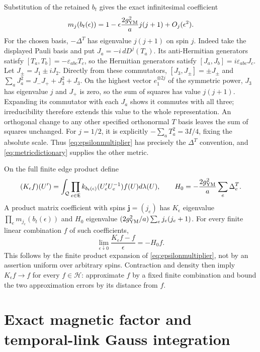 \documentclass[11pt]{article}
\begin{document}
Substitution of the retained $b_t$ gives the exact infinitesimal
coefficient
\begin{equation}\label{eq:epsilonmultiplier}
 m_j(b_t(\epsilon))
 =1-\epsilon\frac{2g_{\rm YM}^2}{a}j(j+1)+O_j(\epsilon^2).
\end{equation}
For the chosen basis, $-\Delta^T$ has eigenvalue $j(j+1)$ on spin $j$.
Indeed take the displayed Pauli basis and put $J_a=-i\,dD^j(T_a)$.
Its anti-Hermitian generators satisfy $[T_a,T_b]=-\varepsilon_{abc}T_c$,
so the Hermitian generators satisfy $[J_a,J_b]=i\varepsilon_{abc}J_c$.
Let $J_\pm=J_1\pm iJ_2$. Directly from these commutators,
$[J_3,J_\pm]=\pm J_\pm$ and
$\sum_aJ_a^2=J_-J_++J_3^2+J_3$. On the highest vector
$e_1^{\otimes 2j}$ of the symmetric power, $J_3$ has eigenvalue $j$
and $J_+$ is zero, so the sum of squares has value $j(j+1)$.
Expanding its commutator with each $J_a$ shows it commutes with all
three; irreducibility therefore extends this value to the whole
representation. An orthogonal change to any other specified
orthonormal $T$ basis leaves the sum of squares unchanged.
For $j=1/2$, it is explicitly
$-\sum_aT_a^2=3I/4$, fixing the absolute scale. Thus
\eqref{eq:epsilonmultiplier} has precisely the $\Delta^T$ convention,
and \eqref{eq:metricdictionary} supplies the other metric.

On the full finite edge product define
\begin{equation}\label{eq:freeproduct}
 (K_\epsilon f)(U')=
 \int_{\mathcal Q}\prod_{e\in\mathsf E}
 k_{b_t(\epsilon)}(U'_eU_e^{-1})f(U)d\lambda(U),
 \qquad
 H_0=-\frac{2g_{\rm YM}^2}{a}\sum_e\Delta_e^T.
\end{equation}
A product matrix coefficient with spins $\boldsymbol j=(j_e)$ has
$K_\epsilon$ eigenvalue $\prod_em_{j_e}(b_t(\epsilon))$ and
$H_0$ eigenvalue $(2g_{\rm YM}^2/a)\sum_ej_e(j_e+1)$.
For every finite linear combination $f$ of such coefficients,
\begin{equation}\label{eq:corederivative}
 \lim_{\epsilon\downarrow0}\frac{K_\epsilon f-f}{\epsilon}=-H_0f.
\end{equation}
This follows by the finite product expansion of
\eqref{eq:epsilonmultiplier}, not by an assertion uniform over arbitrary
spins. Contraction and density then imply $K_\epsilon f\to f$ for every
$f\in\mathcal H$: approximate $f$ by a fixed finite combination and
bound the two approximation errors by its distance from $f$.

\section{Exact magnetic factor and temporal-link Gauss integration}
\end{document}
